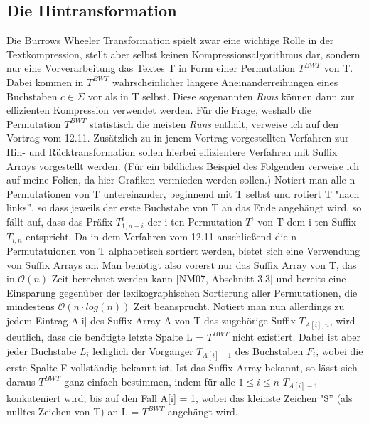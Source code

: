 \documentclass[12pt,twoside]{article}
\begin{document}
\subsection{Die Hintransformation}
Die Burrows Wheeler Transformation spielt zwar eine wichtige Rolle in der Textkompression, stellt aber selbst keinen Kompressionsalgorithmus dar, sondern nur eine Vorverarbeitung das Textes T in Form einer Permutation $T^{BWT}$ von T. Dabei kommen in $T^{BWT}$ wahrscheinlicher längere Aneinanderreihungen eines Buchstaben $c \in \Sigma$ vor als in T selbst. Diese sogenannten \textit{Runs} können dann zur effizienten Kompression verwendet werden. Für die Frage, weshalb die Permutation $T^{BWT}$ statistisch die meisten \textit{Runs} enthält, verweise ich auf den Vortrag vom 12.11. Zusätzlich zu in jenem Vortrag vorgestellten Verfahren zur Hin- und Rücktransformation sollen hierbei effizientere Verfahren mit Suffix Arrays vorgestellt werden. (Für ein bildliches Beispiel des Folgenden verweise ich auf meine Folien, da hier Grafiken vermieden werden sollen.) Notiert man alle n Permutationen von T untereinander, beginnend mit T selbst und rotiert T "nach links'', so dass jeweils der erste Buchstabe von T an das Ende angehängt wird, so fällt auf, dass das Präfix $T^{i}_{1,n-i}$ der i-ten Permutation $T^{i}$ von T dem i-ten Suffix $T_{i,n}$ entspricht. Da in dem Verfahren vom 12.11 anschließend die n Permutatuionen von T alphabetisch sortiert werden, bietet sich eine Verwendung von Suffix Arrays an. Man benötigt also vorerst nur das Suffix Array von T, das in $\mathcal{O}(n)$ Zeit berechnet werden kann [NM07, Abschnitt 3.3] und bereits eine Einsparung gegenüber der lexikographischen Sortierung aller Permutationen, die mindestens $\mathcal{O}(n\cdot log(n))$ Zeit beansprucht. Notiert man nun allerdings zu jedem Eintrag A[i] des Suffix Array A von T das zugehörige Suffix $T_{A[i],n}$, wird deutlich, dass die benötigte letzte Spalte L = $T^{BWT}$ nicht existiert. Dabei ist aber jeder Buchstabe $L_{i}$ lediglich der Vorgänger $T_{A[i]-1}$ des Buchstaben $F_{i}$, wobei die erste Spalte F vollständig bekannt ist. Ist das Suffix Array bekannt, so lässt sich daraus $T^{BWT}$ ganz einfach bestimmen, indem für alle $1\leq i\leq n$ $T_{A[i]-1}$ konkateniert wird, bis auf den Fall A[i] = 1, wobei das kleinste Zeichen "\$'' (als nulltes Zeichen von T) an L = $T^{BWT}$ angehängt wird.
\end{document}
